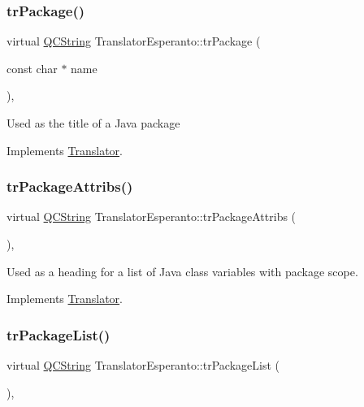 \subsubsection{\texorpdfstring{trPackage()}{trPackage()}}
{\footnotesize\ttfamily virtual \mbox{\hyperlink{class_q_c_string}{Q\+C\+String}} Translator\+Esperanto\+::tr\+Package (\begin{DoxyParamCaption}\item[{const char $\ast$}]{name }\end{DoxyParamCaption})\hspace{0.3cm}{\ttfamily [inline]}, {\ttfamily [virtual]}}

Used as the title of a Java package 

Implements \mbox{\hyperlink{class_translator}{Translator}}.

\mbox{\label{class_translator_esperanto_a9bc87c6e193c5670427256073ca6f9cd}} 
\subsubsection{\texorpdfstring{trPackageAttribs()}{trPackageAttribs()}}
{\footnotesize\ttfamily virtual \mbox{\hyperlink{class_q_c_string}{Q\+C\+String}} Translator\+Esperanto\+::tr\+Package\+Attribs (\begin{DoxyParamCaption}{ }\end{DoxyParamCaption})\hspace{0.3cm}{\ttfamily [inline]}, {\ttfamily [virtual]}}

Used as a heading for a list of Java class variables with package scope. 

Implements \mbox{\hyperlink{class_translator}{Translator}}.

\mbox{\label{class_translator_esperanto_a248a284e8a52c9a07525c931cf5f38a1}} 
\subsubsection{\texorpdfstring{trPackageList()}{trPackageList()}}
{\footnotesize\ttfamily virtual \mbox{\hyperlink{class_q_c_string}{Q\+C\+String}} Translator\+Esperanto\+::tr\+Package\+List (\begin{DoxyParamCaption}{ }\end{DoxyParamCaption})\hspace{0.3cm}{\ttfamily [inline]}, {\ttfamily [virtual]}}

